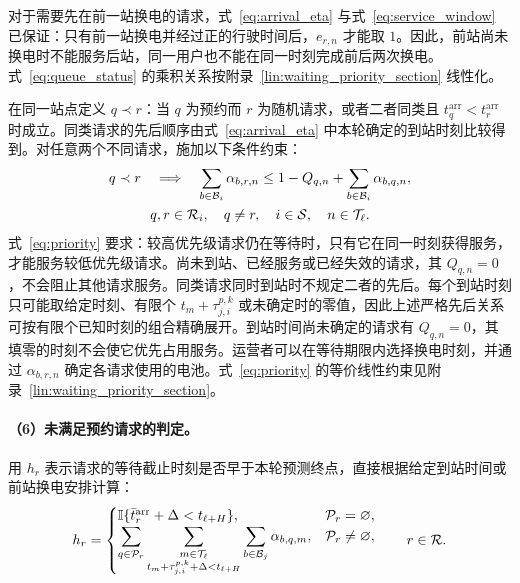 对于需要先在前一站换电的请求，式~\eqref{eq:arrival_eta} 与式~\eqref{eq:service_window} 已保证：只有前一站换电并经过正的行驶时间后，$e_{r,n}$ 才能取 $1$。因此，前站尚未换电时不能服务后站，同一用户也不能在同一时刻完成前后两次换电。式~\eqref{eq:queue_status} 的乘积关系按附录~\ref{lin:waiting_priority_section} 线性化。

在同一站点定义 $q\prec r$：当 $q$ 为预约而 $r$ 为随机请求，或者二者同类且 $t_q^{\mathrm{arr}}<t_r^{\mathrm{arr}}$ 时成立。同类请求的先后顺序由式~\eqref{eq:arrival_eta} 中本轮确定的到站时刻比较得到。对任意两个不同请求，施加以下条件约束：
\begin{equation}
\begin{gathered}
q\prec r\quad\Longrightarrow\quad
\sum_{b\in\mathcal B_i}\alpha_{b,r,n}
\le 1-Q_{q,n}+\sum_{b\in\mathcal B_i}\alpha_{b,q,n},\\
q,r\in\mathcal R_i,\quad q\ne r,\quad i\in\mathcal S,\quad n\in\mathcal T_\ell.
\end{gathered}
\label{eq:priority}
\end{equation}
式~\eqref{eq:priority} 要求：较高优先级请求仍在等待时，只有它在同一时刻获得服务，才能服务较低优先级请求。尚未到站、已经服务或已经失效的请求，其 $Q_{q,n}=0$，不会阻止其他请求服务。同类请求同时到站时不规定二者的先后。每个到站时刻只可能取给定时刻、有限个 $t_m+\tau_{j,i}^{p,k}$ 或未确定时的零值，因此上述严格先后关系可按有限个已知时刻的组合精确展开。到站时间尚未确定的请求有 $Q_{q,n}=0$，其填零的时刻不会使它优先占用服务。运营者可以在等待期限内选择换电时刻，并通过 $\alpha_{b,r,n}$ 确定各请求使用的电池。式~\eqref{eq:priority} 的等价线性约束见附录~\ref{lin:waiting_priority_section}。

\paragraph{（6）未满足预约请求的判定。}
用 $h_r$ 表示请求的等待截止时刻是否早于本轮预测终点，直接根据给定到站时间或前站换电安排计算：
\begin{equation}
h_r=\begin{cases}
\mathbb I\{\bar t_r^{\mathrm{arr}}+\Delta<t_{\ell+H}\},
&\mathcal P_r=\varnothing,\\
\displaystyle\sum_{q\in\mathcal P_r}
\sum_{\substack{m\in\mathcal T_\ell\\
t_m+\tau_{j,i}^{p,k}+\Delta<t_{\ell+H}}}
\sum_{b\in\mathcal B_j}\alpha_{b,q,m},
&\mathcal P_r\ne\varnothing,
\end{cases}
\qquad r\in\mathcal R.
\label{eq:deadline_passed}
\end{equation}


